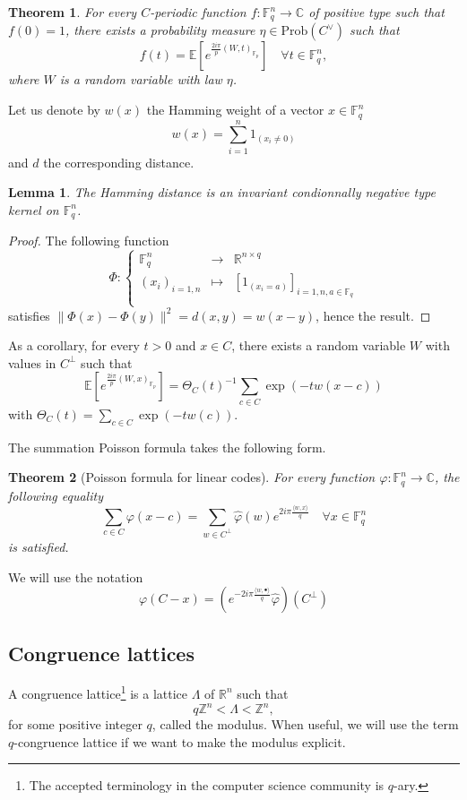 \documentclass{article}
\newtheorem{theorem}{Theorem}
\newtheorem{lemma}{Lemma}
\begin{document}
\begin{theorem}
For every $C$-periodic function $f : \mathbb F_q^n \rightarrow \mathbb C$ of positive type such that $f(0) = 1$, there exists a probability measure $\eta\in \text{Prob} (C^\vee)$ such that 
\[f(t) =\mathbb E[e^{\frac{2i\pi}{p} ( W , t)_{\mathbb F_p} } ]\quad\forall t\in \mathbb F_q^n ,\]
where $W$ is a random variable with law $\eta$.
\end{theorem}

Let us denote by $w(x)$ the Hamming weight of a vector $x\in\mathbb F^n_q$
\[w(x) = \sum_{i=1}^n 1_{(x_i\neq 0)}\]
and $d$ the corresponding distance.

\begin{lemma}
The Hamming distance is an invariant condionnally negative type kernel on $\mathbb F^n_q$.
\end{lemma}

\begin{proof}
The following function \[\Phi : \left\{ \begin{array}{rcl}
\mathbb F^n_q 	& \rightarrow 	& \mathbb R^{n\times q} \\
(x_i)_{i=1,n}	& \mapsto 	& [1_{(x_i = a )}]_{i=1,n , a\in\mathbb F_q}\\
\end{array}\right.\]
satisfies $\|\Phi(x)-\Phi(y)\|^2 = d(x,y) = w(x-y)$, hence the result.
\end{proof}
As a corollary, for every $t>0$ and $x\in C$, there exists a random variable $W$ with values in $C^{\perp}$ such that
\[\mathbb E[e^{\frac{2i\pi}{p} ( W , x)_{\mathbb F_p}}] = \Theta_{C}(t)^{-1}\sum_{c\in C} \exp(-tw(x-c))\]
with $\Theta_{C}(t) = \sum_{c\in C} \exp(-tw(c))$.

The summation Poisson formula takes the following form.
\begin{theorem}[Poisson formula for linear codes]
For every function $\varphi : \mathbb F_q^n \rightarrow \mathbb C$, the following equality 
\[\sum_{c\in C} \varphi(x-c) = \sum_{w\in C^\perp} \hat\varphi(w)e^{2i\pi \frac{\langle w , x\rangle }{q}}\quad\forall x\in \mathbb F_q^n\]
is satisfied.
\end{theorem}
We will use the notation 
\[\varphi (C - x) = \left( e^{-2i\pi \frac{\langle w , \bullet\rangle }{q}}\hat \varphi \right) (C^\perp) \]

\subsection{Congruence lattices} %
A congruence lattice\footnote{The accepted terminology in the computer science community is $q$-ary.} is a lattice $\Lambda$ of $\mathbb R^n$ such that 
\[q\mathbb Z^n < \Lambda < \mathbb Z^n,\]
for some positive integer $q$, called the modulus. When useful, we will use the term $q$-congruence lattice if we want to make the modulus explicit.
 
\end{document}
